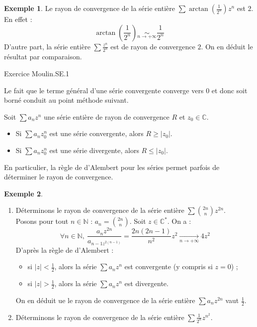 \documentclass[french]{article}
\newcommand{\N}{\mathbb{N}}
\newcommand{\C}{\mathbb{C}}
\newcommand{\st}{^*}
\theoremstyle{plain}
\theoremstyle{definition}
\newtheorem*{ex}{Exemple}
\theoremstyle{remark}
\begin{document}
\begin{ex}
	Le rayon de convergence de la série entière $\displaystyle\sum\arctan\left(\frac{1}{2^n}\right)z^n$ est $2$. En effet : $$\arctan\left(\frac{1}{2^n}\right)\underset{n\to+\infty}{\sim}\frac{1}{2^n}$$ D'autre part, la série entière $\displaystyle\sum\frac{z^n}{2^n}$ est de rayon de convergence $2$. On en déduit le résultat par comparaison.
\end{ex}

Exercice Moulin.SE.1

Le fait que le terme général d'une série convergente converge vers $0$ et donc soit borné conduit au point méthode suivant.

\begin{met}
	Soit $\displaystyle\sum a_nz^n$ une série entière de rayon de convergence $R$ et $z_0\in\C$.
	\begin{itemize}
		\item Si $\displaystyle\sum a_nz_0^n$ est une série convergente, alors $R\geqslant\lvert z_0\rvert$.
		\item Si $\displaystyle\sum a_nz_0^n$ est une série divergente, alors $R\leqslant\lvert z_0\rvert$.
	\end{itemize}
	En particulier, la règle de d'Alembert pour les séries permet parfois de déterminer le rayon de convergence.
\end{met}

\begin{ex}%
	\begin{enumerate}
		\item Déterminons le rayon de convergence de la série entière $\displaystyle\sum\binom{2n}{n}z^{2n}$.\\
		Posons pour tout $n\in\N$ : $a_n=\displaystyle\binom{2n}{n}$. Soit $z\in\C\st$. On a : $$\forall n\in\N,\ \frac{a_nz^{2n}}{a_{n-1z^{2(n-1)}}}=\frac{2n(2n-1)}{n^2}z^2\xrightarrow[n\to+\infty]{}4z^2$$
		D'après la règle de d'Alembert :
		\begin{itemize}
			\item si $\lvert z\rvert <\displaystyle\frac{1}{2}$, alors la série $\displaystyle\sum a_nz^n$ est convergente (y compris si $z=0$) ;
			\item si $\lvert z\rvert >\displaystyle\frac{1}{2}$, alors la série $\displaystyle\sum a_nz^n$ est divergente.
		\end{itemize}
		On en déduit ue le rayon de convergence de la série entière $\displaystyle\sum a_nz^{2n}$ vaut $\displaystyle\frac{1}{2}$.
		\item Déterminons le rayon de convergence de la série entière $\displaystyle\sum\frac{1}{2^n}z^{n^2}$.
	\end{enumerate}
\end{ex}
\end{document}
